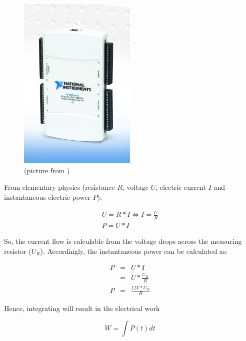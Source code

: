 \begin{figure}
  \centering
    \includegraphics[width=0.5\textwidth]{fig/NI-USB-6218.jpg}
  \caption{\JWPni{} (picture from )}
  \label{fig:ni}
\end{figure}


\label{sec:calc-work}

From elementary physics (resistance $R$, voltage $U$, electric current $I$ and
instantaneous electric power $P$):

\begin{eqnarray}
     U = R * I \iff I = \frac{U}{R} \\
     P = U * I
\end{eqnarray}

So, the current flow is calculable from the voltage drops across the
measuring resistor ($U_R$). Accordingly, the instantaneous power can be
calculated as:

\begin{eqnarray}
P & = & U * I \\
  & = & U * \frac{U_R}{R} \\
P & = & \frac{12V * U_R}{R}
\end{eqnarray}

Hence, integrating will result in the electrical work

\begin{equation}
  W = \int P(t)dt
\end{equation}


